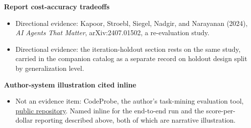 \textbf{Report cost-accuracy tradeoffs}

\begin{itemize}
\tightlist
\item
  Directional evidence: Kapoor, Stroebl, Siegel, Nadgir, and Narayanan (2024), \emph{AI Agents That Matter}, arXiv:2407.01502, a re-evaluation study.
\item
  Directional evidence: the iteration-holdout section rests on the same study, carried in the companion catalog as a separate record on holdout design split by generalization level.
\end{itemize}

\textbf{Author-system illustration cited inline}

\begin{itemize}
\tightlist
\item
  Not an evidence item: CodeProbe, the author's task-mining evaluation tool, \href{https://github.com/sjarmak/codeprobe}{public repository}. Named inline for the end-to-end run and the score-per-dollar reporting described above, both of which are narrative illustration.
\end{itemize}
